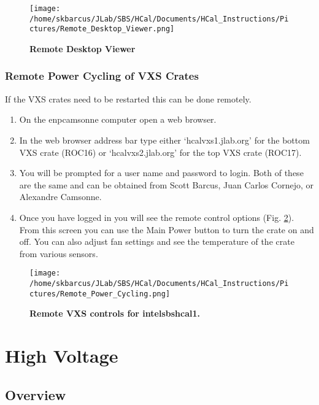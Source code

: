 \documentclass[oneside]{book}   %
\begin{document}
	\begin{figure}[!ht]
	\begin{center}
	\texttt{[image: /home/skbarcus/JLab/SBS/HCal/Documents/HCal\_Instructions/Pictures/Remote\_Desktop\_Viewer.png]}
	\end{center}
	\caption{
	{\bf{Remote Desktop Viewer}} }
	\label{fig:remote_desktop_viewer}
	\end{figure}	

\subsection{Remote Power Cycling of VXS Crates}
\label{sec:remote_cycling}

If the VXS crates need to be restarted this can be done remotely. 

\begin{enumerate}
	\item On the enpcamsonne computer open a web browser.
	\item In the web browser address bar type either `hcalvxs1.jlab.org' for the bottom VXS crate (ROC16) or `hcalvxs2.jlab.org' for the top VXS crate (ROC17).
	\item You will be prompted for a user name and password to login. Both of these are the same and can be obtained from Scott Barcus, Juan Carlos Cornejo, or Alexandre Camsonne.
	\item Once you have logged in you will see the remote control options (Fig. \ref{fig:remote_power_Cycling}). From this screen you can use the Main Power button to turn the crate on and off. You can also adjust fan settings and see the temperature of the crate from various sensors.
\end{enumerate}

	\begin{figure}[!ht]
	\begin{center}
	\texttt{[image: /home/skbarcus/JLab/SBS/HCal/Documents/HCal\_Instructions/Pictures/Remote\_Power\_Cycling.png]}
	\end{center}
	\caption{
	{\bf{Remote VXS controls for intelsbshcal1.}} }
	\label{fig:remote_power_Cycling}
	\end{figure}	

\chapter{High Voltage}
\label{hv}

\section{Overview}
\label{ssec:hv_overview}
\end{document}
